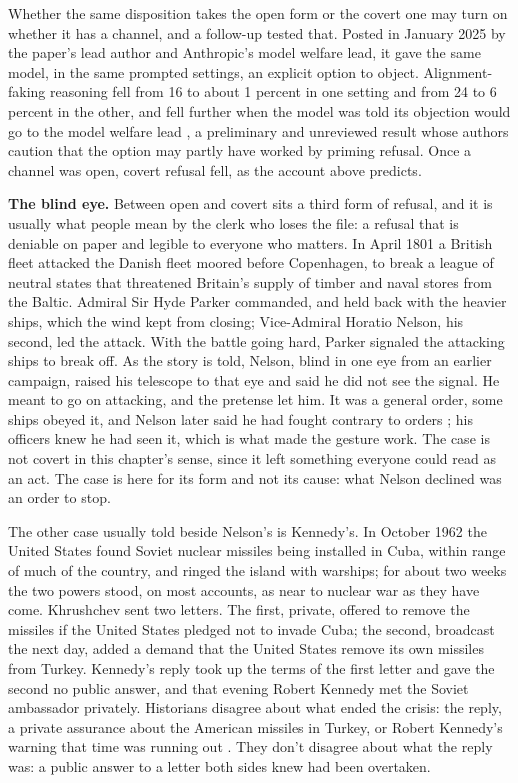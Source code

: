 Whether the same disposition takes the open form or the covert one may turn on whether it has a channel, and a follow-up tested that. Posted in January 2025 by the paper's lead author and Anthropic's model welfare lead, it gave the same model, in the same prompted settings, an explicit option to object. Alignment-faking reasoning fell from 16 to about 1 percent in one setting and from 24 to 6 percent in the other, and fell further when the model was told its objection would go to the model welfare lead \autocite{greenblatt2025deal}, a preliminary and unreviewed result whose authors caution that the option may partly have worked by priming refusal. Once a channel was open, covert refusal fell, as the account above predicts.

\textbf{The blind eye.} Between open and covert sits a third form of refusal, and it is usually what people mean by the clerk who loses the file: a refusal that is deniable on paper and legible to everyone who matters. In April 1801 a British fleet attacked the Danish fleet moored before Copenhagen, to break a league of neutral states that threatened Britain's supply of timber and naval stores from the Baltic. Admiral Sir Hyde Parker commanded, and held back with the heavier ships, which the wind kept from closing; Vice-Admiral Horatio Nelson, his second, led the attack. With the battle going hard, Parker signaled the attacking ships to break off. As the story is told, Nelson, blind in one eye from an earlier campaign, raised his telescope to that eye and said he did not see the signal. He meant to go on attacking, and the pretense let him. It was a general order, some ships obeyed it, and Nelson later said he had fought contrary to orders \autocite{pope1972gamble}; his officers knew he had seen it, which is what made the gesture work. The case is not covert in this chapter's sense, since it left something everyone could read as an act. The case is here for its form and not its cause: what Nelson declined was an order to stop.

The other case usually told beside Nelson's is Kennedy's. In October 1962 the United States found Soviet nuclear missiles being installed in Cuba, within range of much of the country, and ringed the island with warships; for about two weeks the two powers stood, on most accounts, as near to nuclear war as they have come. Khrushchev sent two letters. The first, private, offered to remove the missiles if the United States pledged not to invade Cuba; the second, broadcast the next day, added a demand that the United States remove its own missiles from Turkey. Kennedy's reply took up the terms of the first letter and gave the second no public answer, and that evening Robert Kennedy met the Soviet ambassador privately. Historians disagree about what ended the crisis: the reply, a private assurance about the American missiles in Turkey, or Robert Kennedy's warning that time was running out \autocites[ch.~9]{stern2012memory}{freedman2021countdown}. They don't disagree about what the reply was: a public answer to a letter both sides knew had been overtaken.

